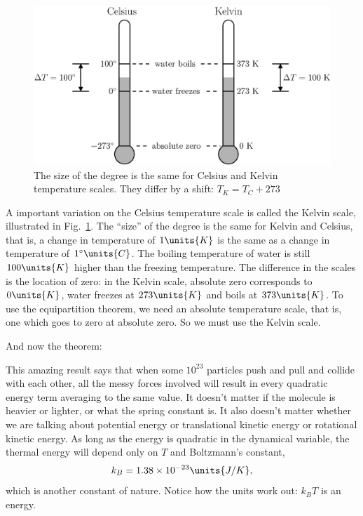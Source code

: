 \begin{figure}
\begin{center}
\includegraphics[width=4.5in]{thermal_energy_and_solids/temperature_scales}
\caption{The size of the degree is the same for Celsius and Kelvin
  temperature scales.  They differ by a shift:  $T_K=T_C+273$}
\label{fig:temperature_scales}
\end{center}
\end{figure}

A important variation on the Celsius temperature scale is called the
Kelvin scale, illustrated in Fig.~\ref{fig:temperature_scales}.  The
``size'' of the degree is the same for Kelvin and Celsius, that is, a
change in temperature of $1\units{K}$ is the same as a change in
temperature of $1^\circ\units{C}$.  The boiling temperature of water
is still $100\units{K}$ higher than the freezing temperature. The
difference in the scales is the location of zero: in the Kelvin scale,
absolute zero corresponds to $0\units{K}$, water freezes at
$273\units{K}$ and boils at $373\units{K}$.  To use the equipartition
theorem, we need an absolute temperature scale, that is, one which
goes to zero at absolute zero.  So we must use the Kelvin scale.

And now the theorem:


This amazing result says that when some $10^{23}$ particles push and pull
and collide with each other, all the messy forces involved will result in
every quadratic energy term averaging to the same value.   It doesn't
matter if the molecule is heavier or lighter, or what the spring
constant is.  It also doesn't matter whether we are talking about
potential energy or translational kinetic energy or rotational kinetic
energy.  As long as the energy is quadratic in the dynamical variable, 
the thermal energy will depend only on $T$ and
Boltzmann's constant,
\begin{equation}
k_B= 1.38\times 10^{-23}\units{J/K},
\end{equation}
which is another constant of nature.  Notice how the units work out:
$k_BT$ is an energy.

